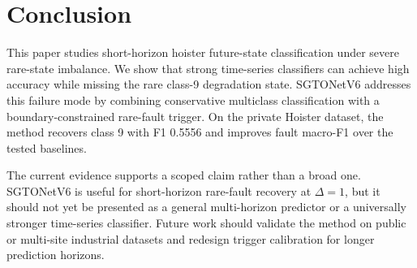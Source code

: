 \section{Conclusion}
\label{sec:conclusion}

This paper studies short-horizon hoister future-state classification under severe rare-state imbalance. We show that strong time-series classifiers can achieve high accuracy while missing the rare class-9 degradation state. SGTONetV6 addresses this failure mode by combining conservative multiclass classification with a boundary-constrained rare-fault trigger. On the private Hoister dataset, the method recovers class 9 with F1 0.5556 and improves fault macro-F1 over the tested baselines.

The current evidence supports a scoped claim rather than a broad one. SGTONetV6 is useful for short-horizon rare-fault recovery at $\Delta=1$, but it should not yet be presented as a general multi-horizon predictor or a universally stronger time-series classifier. Future work should validate the method on public or multi-site industrial datasets and redesign trigger calibration for longer prediction horizons.
